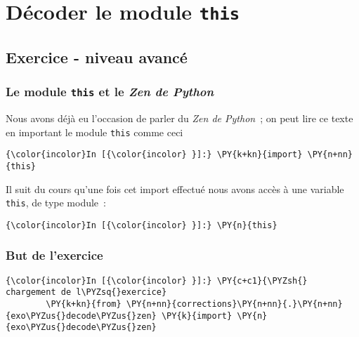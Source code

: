     \hypertarget{duxe9coder-le-module-this}{%
\section{\texorpdfstring{Décoder le module
\texttt{this}}{Décoder le module this}}\label{duxe9coder-le-module-this}}

    \hypertarget{exercice---niveau-avancuxe9}{%
\subsection{Exercice - niveau
avancé}\label{exercice---niveau-avancuxe9}}

    \hypertarget{le-module-this-et-le-zen-de-python}{%
\subsubsection{\texorpdfstring{Le module \texttt{this} et le \emph{Zen
de
Python}}{Le module this et le Zen de Python}}\label{le-module-this-et-le-zen-de-python}}

    Nous avons déjà eu l'occasion de parler du \emph{Zen de Python}~; on
peut lire ce texte en important le module \texttt{this} comme ceci

    \begin{Verbatim}[commandchars=\\\{\}]
{\color{incolor}In [{\color{incolor} }]:} \PY{k+kn}{import} \PY{n+nn}{this}
\end{Verbatim}


    Il suit du cours qu'une fois cet import effectué nous avons accès à une
variable \texttt{this}, de type module~:

    \begin{Verbatim}[commandchars=\\\{\}]
{\color{incolor}In [{\color{incolor} }]:} \PY{n}{this}
\end{Verbatim}


    \hypertarget{but-de-lexercice}{%
\subsubsection{But de l'exercice}\label{but-de-lexercice}}

    \begin{Verbatim}[commandchars=\\\{\}]
{\color{incolor}In [{\color{incolor} }]:} \PY{c+c1}{\PYZsh{} chargement de l\PYZsq{}exercice}
        \PY{k+kn}{from} \PY{n+nn}{corrections}\PY{n+nn}{.}\PY{n+nn}{exo\PYZus{}decode\PYZus{}zen} \PY{k}{import} \PY{n}{exo\PYZus{}decode\PYZus{}zen}
\end{Verbatim}


